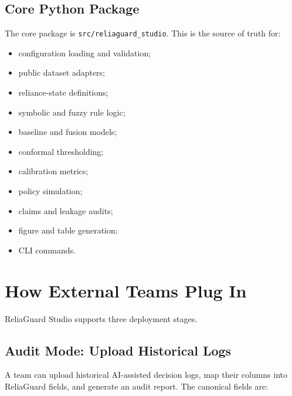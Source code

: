 \documentclass[11pt]{article}
\newcommand{\product}{ReliaGuard Studio}
\newcommand{\codepath}[1]{\nolinkurl{#1}}
\begin{document}
\subsection{Core Python Package}

The core package is \codepath{src/reliaguard\_studio}. This is the source of truth for:

\begin{itemize}[leftmargin=*]
  \item configuration loading and validation;
  \item public dataset adapters;
  \item reliance-state definitions;
  \item symbolic and fuzzy rule logic;
  \item baseline and fusion models;
  \item conformal thresholding;
  \item calibration metrics;
  \item policy simulation;
  \item claims and leakage audits;
  \item figure and table generation;
  \item CLI commands.
\end{itemize}

\section{How External Teams Plug In}

\product{} supports three deployment stages.

\subsection{Audit Mode: Upload Historical Logs}

A team can upload historical AI-assisted decision logs, map their columns into ReliaGuard fields, and generate an audit report. The canonical fields are:
\end{document}
